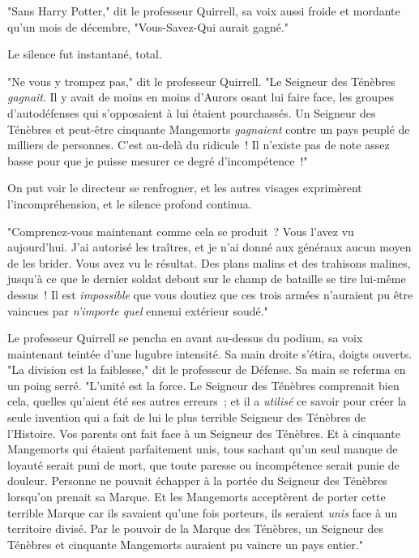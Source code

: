 "Sans Harry Potter," dit le professeur Quirrell, sa voix aussi froide et mordante qu'un mois de décembre, "Vous-Savez-Qui aurait gagné."

Le silence fut instantané, total.

\later

"Ne vous y trompez pas," dit le professeur Quirrell. "Le Seigneur des Ténèbres \emph{gagnait}. Il y avait de moins en moins d'Aurors osant lui faire face, les groupes d'autodéfenses qui s'opposaient à lui étaient pourchassés. Un Seigneur des Ténèbres et peut-être cinquante Mangemorts \emph{gagnaient} contre un pays peuplé de milliers de personnes. C'est au-delà du ridicule~! Il n'existe pas de note assez basse pour que je puisse mesurer ce degré d'incompétence~!"

On put voir le directeur se renfrogner, et les autres visages exprimèrent l'incompréhension, et le silence profond continua.

"Comprenez-vous maintenant comme cela se produit~? Vous l'avez vu aujourd'hui. J'ai autorisé les traîtres, et je n'ai donné aux généraux aucun moyen de les brider. Vous avez vu le résultat. Des plans malins et des trahisons malines, jusqu'à ce que le dernier soldat debout sur le champ de bataille se tire lui-même dessus~! Il est \emph{impossible} que vous doutiez que ces trois armées n'auraient pu être vaincues par \emph{n'importe quel} ennemi extérieur soudé."

Le professeur Quirrell se pencha en avant au-dessus du podium, sa voix maintenant teintée d'une lugubre intensité. Sa main droite s'étira, doigts ouverts. "La division est la faiblesse," dit le professeur de Défense. Sa main se referma en un poing serré. "L'unité est la force. Le Seigneur des Ténèbres comprenait bien cela, quelles qu'aient été ses autres erreurs~; et il a \emph{utilisé} ce savoir pour créer la seule invention qui a fait de lui le plus terrible Seigneur des Ténèbres de l'Histoire. Vos parents ont fait face à un Seigneur des Ténèbres. Et à cinquante Mangemorts qui étaient parfaitement unis, tous sachant qu'un seul manque de loyauté serait puni de mort, que toute paresse ou incompétence serait punie de douleur. Personne ne pouvait échapper à la portée du Seigneur des Ténèbres lorsqu'on prenait sa Marque. Et les Mangemorts acceptèrent de porter cette terrible Marque car ils savaient qu'une fois porteurs, ils seraient \emph{unis} face à un territoire divisé. Par le pouvoir de la Marque des Ténèbres, un Seigneur des Ténèbres et cinquante Mangemorts auraient pu vaincre un pays entier."

